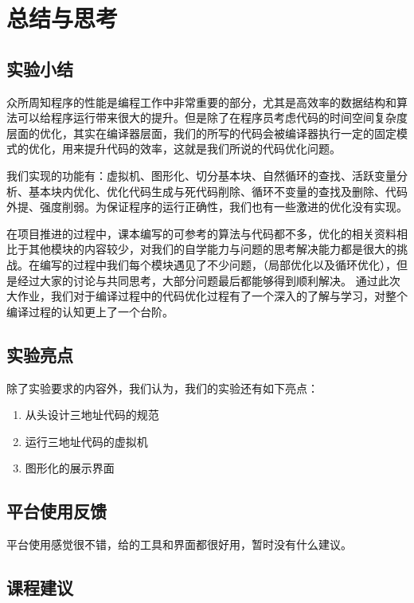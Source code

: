 \documentclass[cn,black,11pt,normal]{elegantnote}
\begin{document}
\section{总结与思考}

\subsection{实验小结}

众所周知程序的性能是编程工作中非常重要的部分，尤其是高效率的数据结构和算法可以给程序运行带来很大的提升。但是除了在程序员考虑代码的时间空间复杂度层面的优化，其实在编译器层面，我们的所写的代码会被编译器执行一定的固定模式的优化，用来提升代码的效率，这就是我们所说的代码优化问题。

我们实现的功能有：虚拟机、图形化、切分基本块、自然循环的查找、活跃变量分析、基本块内优化、优化代码生成与死代码削除、循环不变量的查找及删除、代码外提、强度削弱。为保证程序的运行正确性，我们也有一些激进的优化没有实现。

在项目推进的过程中，课本编写的可参考的算法与代码都不多，优化的相关资料相比于其他模块的内容较少，对我们的自学能力与问题的思考解决能力都是很大的挑战。在编写的过程中我们每个模块遇见了不少问题，（局部优化以及循环优化），但是经过大家的讨论与共同思考，大部分问题最后都能够得到顺利解决。
通过此次大作业，我们对于编译过程中的代码优化过程有了一个深入的了解与学习，对整个编译过程的认知更上了一个台阶。


\subsection{实验亮点}

除了实验要求的内容外，我们认为，我们的实验还有如下亮点：
\begin{enumerate}
    \item 从头设计三地址代码的规范
    \item 运行三地址代码的虚拟机
    \item 图形化的展示界面
\end{enumerate}

\subsection{平台使用反馈}

平台使用感觉很不错，给的工具和界面都很好用，暂时没有什么建议。

\subsection{课程建议}
\end{document}

